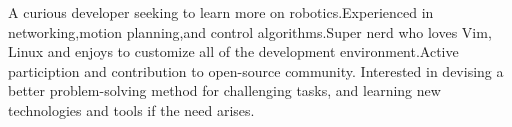 

\begin{cvparagraph}

 A curious developer seeking to learn more on robotics.Experienced in networking,motion planning,and control algorithms.Super nerd who loves Vim, Linux \faHeart and enjoys to customize all of the development environment.Active particiption and contribution to open-source community. Interested in devising a better problem-solving method for challenging tasks, and learning new technologies and tools if the need arises.
\end{cvparagraph}
